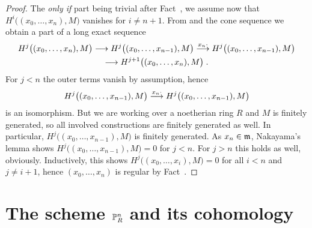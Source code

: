 \documentclass[a4paper,parskip=half,numbers=enddot, DIV=12]{scrreprt}
\begin{document}
\begin{proof}
	The \emph{only if} part being trivial after Fact~, we assume now that $H^i\big((x_0,\ldots,x_n),M\big)$ vanishes for $i\neq n+1$. From  and the cone sequence  we obtain a part of a long exact sequence
	\begin{multline*}
	H^j\big((x_0,\ldots,x_n),M\big)\morphism H^j\big((x_0,\ldots,x_{n-1}),M\big)\morphism[x_n\cdot] H^j\big((x_0,\ldots,x_{n-1}),M\big)\\
	\morphism H^{j+1}\big((x_0,\ldots,x_n),M\big)\;.
	\end{multline*}
	For $j<n$ the outer terms vanish by assumption, hence
	\begin{align*}
	H^j\big((x_0,\ldots,x_{n-1}),M\big)\morphism[x_n\cdot] H^j\big((x_0,\ldots,x_{n-1}),M\big)
	\end{align*}
	is an isomorphism. But we are working over a noetherian ring $R$ and $M$ is finitely generated, so all involved constructions are finitely generated as well. In particular, $H^j\big((x_0,\ldots,x_{n-1}),M\big)$ is finitely generated. As $x_n\in\mathfrak{m}$, Nakayama's lemma shows $H^j\big((x_0,\ldots,x_{n-1}),M\big)=0$ for $j<n$. For $j>n$ this holds as well, obviously. Inductively, this shows $H^j\big((x_0,\ldots,x_i),M\big)=0$ for all $i<n$ and $j\neq i+1$, hence $(x_0,\ldots,x_n)$ is regular by Fact~.			
\end{proof}

\section{The scheme \texorpdfstring{$\mathbb{P}_R^n$}{P} and its cohomology}
\end{document}
